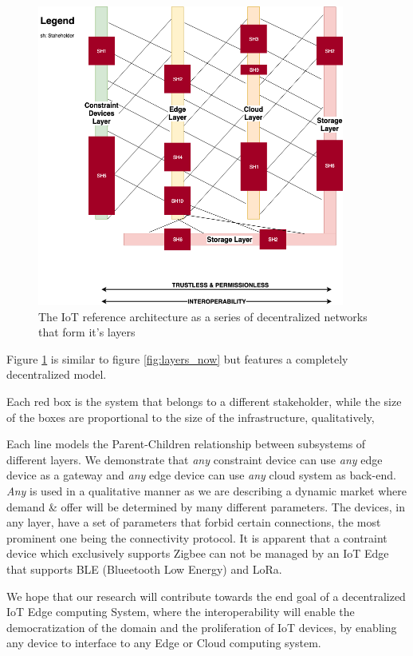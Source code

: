 \begin{figure}[h]
    \centering
    \includegraphics[width=0.9\textwidth]{images/layers_decentralized_v2.png}
    \caption{The IoT reference architecture as a series of decentralized networks that form it's layers}
    \label{fig:layers_decent}
\end{figure}


Figure \ref{fig:layers_decent} is similar to figure \ref{fig:layers_now} but features a completely decentralized model.

Each red box is the system that belongs to a different stakeholder, while the size of the boxes are proportional to the size of the infrastructure, qualitatively,

Each line models the Parent-Children relationship between subsystems of different layers. We demonstrate that \textit{any} constraint device can use \textit{any} edge device as a gateway and \textit{any} edge device can use \textit{any} cloud system as back-end. \textit{Any} is used in a qualitative manner as we are describing a dynamic market where demand \& offer will be determined by many different parameters. The devices, in any layer, have a set of parameters that forbid certain connections, the most prominent one being the connectivity protocol. It is apparent that a contraint device which exclusively supports Zigbee can not be managed by an IoT Edge that supports BLE (Blueetooth Low Energy) and LoRa.

We hope that our research will contribute towards the end goal of a decentralized IoT Edge computing System, where the interoperability will enable the democratization of the domain and the proliferation of IoT devices, by enabling any device to interface to any Edge or Cloud computing system. 
